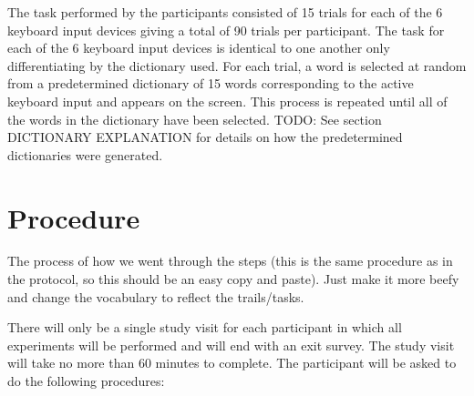 The task performed by the participants consisted of 15 trials for each of the 6 keyboard input devices giving a total of 90 trials per participant. The task for each of the 6 keyboard input devices is identical to one another only differentiating by the dictionary used. For each trial, a word is selected at random from a predetermined dictionary of 15 words corresponding to the active keyboard input and appears on the screen. This process is repeated until all of the words in the dictionary have been selected. TODO: See section DICTIONARY EXPLANATION for details on how the predetermined dictionaries were generated.

\section{Procedure}

The process of how we went through the steps (this is the same procedure as in the protocol, so this should be an easy copy and paste). Just make it more beefy and change the vocabulary to reflect the trails/tasks.

There will only be a single study visit for each participant in which all experiments will be performed and will end with an exit survey. The study visit will take no more than 60 minutes to complete. The participant will be asked to do the following procedures:

